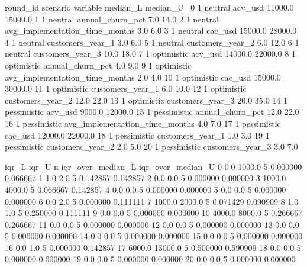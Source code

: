 \begin{APACode}
    round_id     scenario                        variable  median_L  median_U  \
0          1      neutral                         acv_usd   11000.0   15000.0   
1          1      neutral                annual_churn_pct       7.0      14.0   
2          1      neutral  avg_implementation_time_months       3.0       6.0   
3          1      neutral                         cac_usd   15000.0   28000.0   
4          1      neutral                customers_year_1       3.0       6.0   
5          1      neutral                customers_year_2       6.0      12.0   
6          1      neutral                customers_year_3      10.0      18.0   
7          1   optimistic                         acv_usd   14000.0   22000.0   
8          1   optimistic                annual_churn_pct       4.0       9.0   
9          1   optimistic  avg_implementation_time_months       2.0       4.0   
10         1   optimistic                         cac_usd   15000.0   30000.0   
11         1   optimistic                customers_year_1       6.0      10.0   
12         1   optimistic                customers_year_2      12.0      22.0   
13         1   optimistic                customers_year_3      20.0      35.0   
14         1  pessimistic                         acv_usd    9000.0   12000.0   
15         1  pessimistic                annual_churn_pct      12.0      22.0   
16         1  pessimistic  avg_implementation_time_months       4.0       7.0   
17         1  pessimistic                         cac_usd   12000.0   22000.0   
18         1  pessimistic                customers_year_1       1.0       3.0   
19         1  pessimistic                customers_year_2       2.0       5.0   
20         1  pessimistic                customers_year_3       3.0       7.0   

     iqr_L    iqr_U  n  iqr_over_median_L  iqr_over_median_U  
0      0.0   1000.0  5           0.000000           0.066667  
1      1.0      2.0  5           0.142857           0.142857  
2      0.0      0.0  5           0.000000           0.000000  
3   1000.0   4000.0  5           0.066667           0.142857  
4      0.0      0.0  5           0.000000           0.000000  
5      0.0      0.0  5           0.000000           0.000000  
6      0.0      2.0  5           0.000000           0.111111  
7   1000.0   2000.0  5           0.071429           0.090909  
8      1.0      1.0  5           0.250000           0.111111  
9      0.0      0.0  5           0.000000           0.000000  
10  4000.0   8000.0  5           0.266667           0.266667  
11     0.0      0.0  5           0.000000           0.000000  
12     0.0      0.0  5           0.000000           0.000000  
13     0.0      0.0  5           0.000000           0.000000  
14     0.0      0.0  5           0.000000           0.000000  
15     0.0      0.0  5           0.000000           0.000000  
16     0.0      1.0  5           0.000000           0.142857  
17  6000.0  13000.0  5           0.500000           0.590909  
18     0.0      0.0  5           0.000000           0.000000  
19     0.0      0.0  5           0.000000           0.000000  
20     0.0      0.0  5           0.000000           0.000000  
\end{APACode}

